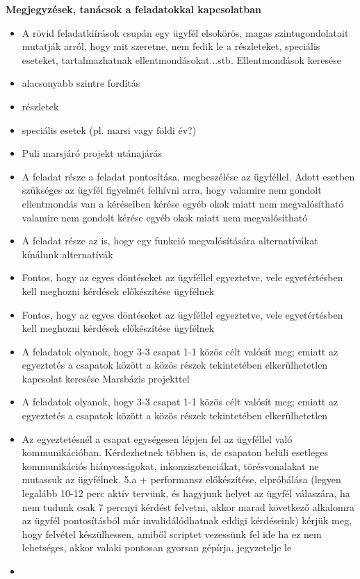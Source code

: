 \documentclass[12pt]{report}
\begin{document}
\begin{itemize}
\textbf{Megjegyzések, tanácsok a feladatokkal kapcsolatban} 
\begin{itemize}
    \item A rövid feladatkiírások csupán egy ügyfél elsokörös, magas szintugondolatait mutatják arról, hogy mit szeretne, nem fedik le a részleteket, speciális eseteket, tartalmazhatnak ellentmondásokat...stb.
    Ellentmondások keresése
    \item alacsonyabb szintre fordítás
    \item részletek
    \item speciális esetek (pl. marsi vagy földi év?)
    \item Puli marsjáró projekt utánajárás
    \item A feladat része a feladat pontosítása, megbeszélése az ügyféllel. Adott esetben szükséges az ügyfél figyelmét felhívni arra, hogy valamire nem gondolt  ellentmondás van a kéréseiben  kérése egyéb okok miatt nem megvalósítható    
    valamire nem gondolt kérése egyéb okok miatt nem megvalósítható
    \item A feladat része az is, hogy egy funkció megvalósítására alternatívákat kínálunk    
    alternatívák
    \item Fontos, hogy az egyes döntéseket az ügyféllel egyeztetve, vele egyetértésben kell meghozni
    kérdések előkészítése ügyfélnek
    \item Fontos, hogy az egyes döntéseket az ügyféllel egyeztetve, vele egyetértésben kell meghozni
    kérdések előkészítése ügyfélnek
    \item A feladatok olyanok, hogy 3-3 csapat 1-1 közös célt valósít meg; emiatt az egyeztetés a csapatok között a közös részek tekintetében elkerülhetetlen
    kapcsolat keresése Marsbázis projekttel
    \item A feladatok olyanok, hogy 3-3 csapat 1-1 közös célt valósít meg; emiatt az egyeztetés a csapatok között a közös részek tekintetében elkerülhetetlen
    \item Az egyeztetésnél a csapat egységesen lépjen fel az ügyféllel való kommunikációban. Kérdezhetnek többen is, de csapaton belüli esetleges kommunikációs hiányosságokat, inkonzisztenciákat, törésvonalakat ne mutassuk az ügyfélnek.
    5.a + performansz előkészítése, elpróbálása (legyen legalább 10-12 perc aktív tervünk, és hagyjunk helyet az ügyfél válaszára, ha nem tudunk csak 7 percnyi kérdést felvetni, akkor marad következő alkalomra  az ügyfél pontosításból már invalidálódhatnak eddigi kérdéseink)
    kérjük meg, hogy felvétel készülhessen, amiből scriptet vezessünk fel ide
    ha ez nem lehetséges, akkor valaki pontosan gyorsan gépírja, jegyzetelje le
    \item 


\end{itemize}
\end{itemize}
\end{document}
